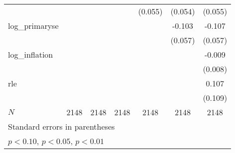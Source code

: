 {\begin{tabular}{l*{6}{c}}
            &                     &                     &                     &     (0.055)         &     (0.054)         &     (0.055)         \\
\addlinespace
log\_primaryse&                     &                     &                     &                     &      -0.103\sym{*}  &      -0.107\sym{*}  \\
            &                     &                     &                     &                     &     (0.057)         &     (0.057)         \\
\addlinespace
log\_inflation&                     &                     &                     &                     &                     &      -0.009         \\
            &                     &                     &                     &                     &                     &     (0.008)         \\
\addlinespace
rle         &                     &                     &                     &                     &                     &       0.107         \\
            &                     &                     &                     &                     &                     &     (0.109)         \\
\midrule
\(N\)       &        2148         &        2148         &        2148         &        2148         &        2148         &        2148         \\
\bottomrule
\multicolumn{7}{l}{\footnotesize Standard errors in parentheses}\\
\multicolumn{7}{l}{\footnotesize \sym{*} \(p<0.10\), \sym{**} \(p<0.05\), \sym{***} \(p<0.01\)}\\
\end{tabular}
}
